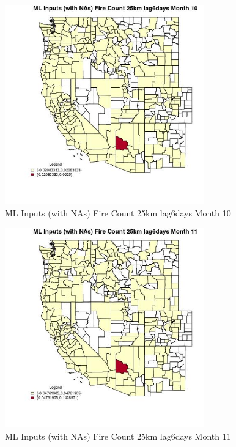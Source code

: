 \begin{figure} 
\centering  
\includegraphics[width=0.77\textwidth]{Code_Outputs/Report_ML_input_PM25_Step4_part_e_de_duplicated_aves_compiled_2019-05-21wNAs_CountyFire_Count_25km_lag6daysmedianMonth10.jpg} 
\caption{\label{fig:Report_ML_input_PM25_Step4_part_e_de_duplicated_aves_compiled_2019-05-21wNAsCountyFire_Count_25km_lag6daysmedianMonth10}ML Inputs (with NAs) Fire Count 25km lag6days Month 10} 
\end{figure} 
 

\begin{figure} 
\centering  
\includegraphics[width=0.77\textwidth]{Code_Outputs/Report_ML_input_PM25_Step4_part_e_de_duplicated_aves_compiled_2019-05-21wNAs_CountyFire_Count_25km_lag6daysmedianMonth11.jpg} 
\caption{\label{fig:Report_ML_input_PM25_Step4_part_e_de_duplicated_aves_compiled_2019-05-21wNAsCountyFire_Count_25km_lag6daysmedianMonth11}ML Inputs (with NAs) Fire Count 25km lag6days Month 11} 
\end{figure} 
 

